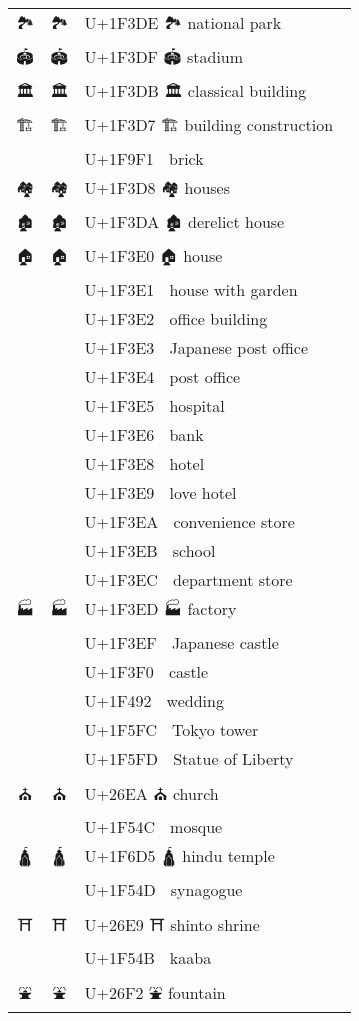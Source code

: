 \documentclass[a4paper,12pt]{article}
\newcommand{\fontA}[1]{{\fontspec[RawFeature={mode=harf,+dist,+ccmp}]{Segoe UI Emoji} #1}}
\newcommand{\fontB}[1]{{\fontspec[RawFeature={mode=harf,+dist,+ccmp}]{Noto Color Emoji} #1}}
\begin{document}
\begin{longtable}[c]{ccp{0.8\linewidth}}
\fontA{🏞}&\fontB{🏞}&U+1F3DE 🏞 national park\\
\fontA{🏟}&\fontB{🏟}&U+1F3DF 🏟 stadium\\
\fontA{🏛}&\fontB{🏛}&U+1F3DB 🏛 classical building\\
\fontA{🏗}&\fontB{🏗}&U+1F3D7 🏗 building construction\\
\fontA{🧱}&\fontB{🧱}&U+1F9F1 🧱 brick\\
\fontA{🏘}&\fontB{🏘}&U+1F3D8 🏘 houses\\
\fontA{🏚}&\fontB{🏚}&U+1F3DA 🏚 derelict house\\
\fontA{🏠}&\fontB{🏠}&U+1F3E0 🏠 house\\
\fontA{🏡}&\fontB{🏡}&U+1F3E1 🏡 house with garden\\
\fontA{🏢}&\fontB{🏢}&U+1F3E2 🏢 office building\\
\fontA{🏣}&\fontB{🏣}&U+1F3E3 🏣 Japanese post office\\
\fontA{🏤}&\fontB{🏤}&U+1F3E4 🏤 post office\\
\fontA{🏥}&\fontB{🏥}&U+1F3E5 🏥 hospital\\
\fontA{🏦}&\fontB{🏦}&U+1F3E6 🏦 bank\\
\fontA{🏨}&\fontB{🏨}&U+1F3E8 🏨 hotel\\
\fontA{🏩}&\fontB{🏩}&U+1F3E9 🏩 love hotel\\
\fontA{🏪}&\fontB{🏪}&U+1F3EA 🏪 convenience store\\
\fontA{🏫}&\fontB{🏫}&U+1F3EB 🏫 school\\
\fontA{🏬}&\fontB{🏬}&U+1F3EC 🏬 department store\\
\fontA{🏭}&\fontB{🏭}&U+1F3ED 🏭 factory\\
\fontA{🏯}&\fontB{🏯}&U+1F3EF 🏯 Japanese castle\\
\fontA{🏰}&\fontB{🏰}&U+1F3F0 🏰 castle\\
\fontA{💒}&\fontB{💒}&U+1F492 💒 wedding\\
\fontA{🗼}&\fontB{🗼}&U+1F5FC 🗼 Tokyo tower\\
\fontA{🗽}&\fontB{🗽}&U+1F5FD 🗽 Statue of Liberty\\
\fontA{⛪}&\fontB{⛪}&U+26EA ⛪ church\\
\fontA{🕌}&\fontB{🕌}&U+1F54C 🕌 mosque\\
\fontA{🛕}&\fontB{🛕}&U+1F6D5 🛕 hindu temple\\
\fontA{🕍}&\fontB{🕍}&U+1F54D 🕍 synagogue\\
\fontA{⛩}&\fontB{⛩}&U+26E9 ⛩ shinto shrine\\
\fontA{🕋}&\fontB{🕋}&U+1F54B 🕋 kaaba\\
\fontA{⛲}&\fontB{⛲}&U+26F2 ⛲ fountain\\

\end{longtable}
\end{document}
